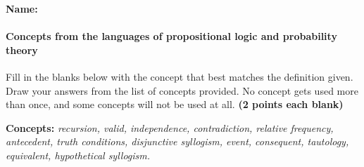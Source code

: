 \documentclass[10pt]{article}
\begin{document}
\small

\textbf{Name:}\underline{\hspace{2in}}

\paragraph{Concepts from the languages of propositional logic and probability theory}

Fill in the blanks below with the concept that best matches the definition given. Draw your answers from the list of concepts provided. No concept gets used more than once, and some concepts will not be used at all. \textbf{(2 points each blank)}
\begin{center}\textbf{Concepts:} \textit{recursion, valid, independence, contradiction, relative frequency, antecedent, truth conditions, disjunctive syllogism, event, consequent, tautology, equivalent, hypothetical syllogism.}\end{center}
\end{document}
